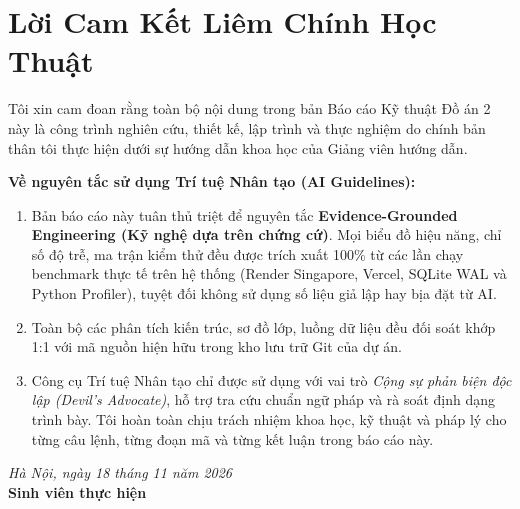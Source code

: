 \chapter*{Lời Cam Kết Liêm Chính Học Thuật}

Tôi xin cam đoan rằng toàn bộ nội dung trong bản Báo cáo Kỹ thuật Đồ án 2 này là công trình nghiên cứu, thiết kế, lập trình và thực nghiệm do chính bản thân tôi thực hiện dưới sự hướng dẫn khoa học của Giảng viên hướng dẫn.

\textbf{Về nguyên tắc sử dụng Trí tuệ Nhân tạo (AI Guidelines):}
\begin{enumerate}[leftmargin=2em]
    \item Bản báo cáo này tuân thủ triệt để nguyên tắc \textbf{Evidence-Grounded Engineering (Kỹ nghệ dựa trên chứng cứ)}. Mọi biểu đồ hiệu năng, chỉ số độ trễ, ma trận kiểm thử đều được trích xuất 100\% từ các lần chạy benchmark thực tế trên hệ thống (Render Singapore, Vercel, SQLite WAL và Python Profiler), tuyệt đối không sử dụng số liệu giả lập hay bịa đặt từ AI.
    \item Toàn bộ các phân tích kiến trúc, sơ đồ lớp, luồng dữ liệu đều đối soát khớp 1:1 với mã nguồn hiện hữu trong kho lưu trữ Git của dự án.
    \item Công cụ Trí tuệ Nhân tạo chỉ được sử dụng với vai trò \textit{Cộng sự phản biện độc lập (Devil's Advocate)}, hỗ trợ tra cứu chuẩn ngữ pháp và rà soát định dạng trình bày. Tôi hoàn toàn chịu trách nhiệm khoa học, kỹ thuật và pháp lý cho từng câu lệnh, từng đoạn mã và từng kết luận trong báo cáo này.
\end{enumerate}

\vspace{1.5cm}
\begin{flushright}
    \textit{Hà Nội, ngày 18 tháng 11 năm 2026}\\[0.5em]
    \textbf{Sinh viên thực hiện}\\[3.0cm]
    \textbf{\StudentName}
\end{flushright}
